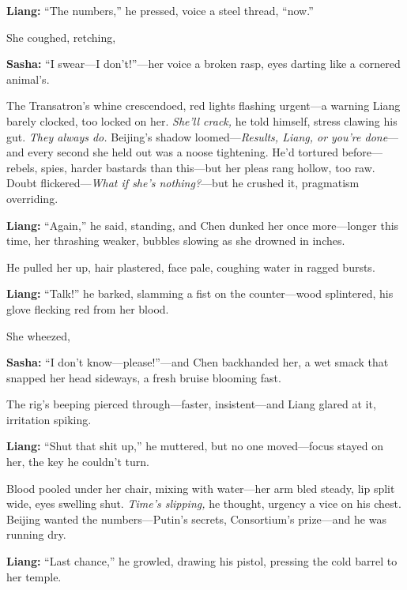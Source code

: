 \documentclass[12pt]{book}
\begin{document}
\vspace{0.5em}
\textbf{Liang:} “The numbers,” he pressed, voice a steel thread, “now.”

She coughed, retching, 

\vspace{0.5em}
\textbf{Sasha:} “I swear—I don’t!”—her voice a broken rasp, eyes darting like a cornered animal’s.

The Transatron’s whine crescendoed, red lights flashing urgent—a warning Liang barely clocked, too locked on her. \emph{She’ll crack,} he told himself, stress clawing his gut. \emph{They always do.} Beijing’s shadow loomed—\emph{Results, Liang, or you’re done}—and every second she held out was a noose tightening. He’d tortured before—rebels, spies, harder bastards than this—but her pleas rang hollow, too raw. Doubt flickered—\emph{What if she’s nothing?}—but he crushed it, pragmatism overriding. 

\vspace{0.5em}
\textbf{Liang:} “Again,” he said, standing, and Chen dunked her once more—longer this time, her thrashing weaker, bubbles slowing as she drowned in inches.

He pulled her up, hair plastered, face pale, coughing water in ragged bursts. 

\vspace{0.5em}
\textbf{Liang:} “Talk!” he barked, slamming a fist on the counter—wood splintered, his glove flecking red from her blood.

She wheezed, 

\vspace{0.5em}
\textbf{Sasha:} “I don’t know—please!”—and Chen backhanded her, a wet smack that snapped her head sideways, a fresh bruise blooming fast.

The rig’s beeping pierced through—faster, insistent—and Liang glared at it, irritation spiking. 

\vspace{0.5em}
\textbf{Liang:} “Shut that shit up,” he muttered, but no one moved—focus stayed on her, the key he couldn’t turn.

Blood pooled under her chair, mixing with water—her arm bled steady, lip split wide, eyes swelling shut. \emph{Time’s slipping,} he thought, urgency a vice on his chest. Beijing wanted the numbers—Putin’s secrets, Consortium’s prize—and he was running dry. 

\vspace{0.5em}
\textbf{Liang:} “Last chance,” he growled, drawing his pistol, pressing the cold barrel to her temple.
\end{document}
